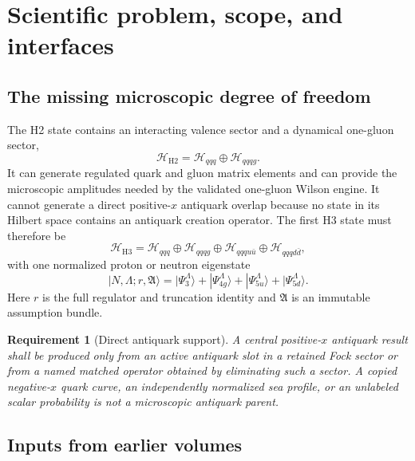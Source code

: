 \documentclass[11pt]{article}
\newtheorem{requirement}[definition]{Requirement}
\newcommand{\Hil}{\mathcal H}
\newcommand{\Hthree}{\Hil_{qqq}}
\newcommand{\Hfour}{\Hil_{qqqg}}
\newcommand{\Hfiveu}{\Hil_{qqqu\bar u}}
\newcommand{\Hfived}{\Hil_{qqqd\bar d}}
\begin{document}
\tableofcontents

\section{Scientific problem, scope, and interfaces}
\label{sec:scope}

\subsection{The missing microscopic degree of freedom}

The H2 state contains an interacting valence sector and a dynamical one-gluon
sector,
\begin{equation}
 \Hil_{\mathrm{H2}}
 =
 \Hthree\oplus\Hfour.
\end{equation}
It can generate regulated quark and gluon matrix elements and can provide the
microscopic amplitudes needed by the validated one-gluon Wilson engine.  It
cannot generate a direct positive-\(x\) antiquark overlap because no state in
its Hilbert space contains an antiquark creation operator.  The first H3 state
must therefore be
\begin{equation}
 \Hil_{\mathrm{H3}}
 =
 \Hthree
 \oplus\Hfour
 \oplus\Hfiveu
 \oplus\Hfived,
 \label{eq:h3-space}
\end{equation}
with one normalized proton or neutron eigenstate
\begin{equation}
 |N,\Lambda;r,\mathfrak A\rangle
 =
 |\Psi_{3}^{\Lambda}\rangle
 +|\Psi_{4g}^{\Lambda}\rangle
 +|\Psi_{5u}^{\Lambda}\rangle
 +|\Psi_{5d}^{\Lambda}\rangle.
 \label{eq:h3-state}
\end{equation}
Here \(r\) is the full regulator and truncation identity and
\(\mathfrak A\) is an immutable assumption bundle.

\begin{requirement}[Direct antiquark support]
A central positive-\(x\) antiquark result shall be produced only from an
active antiquark slot in a retained Fock sector or from a named matched
operator obtained by eliminating such a sector.  A copied negative-\(x\)
quark curve, an independently normalized sea profile, or an unlabeled scalar
probability is not a microscopic antiquark parent.
\end{requirement}

\subsection{Inputs from earlier volumes}
\end{document}
